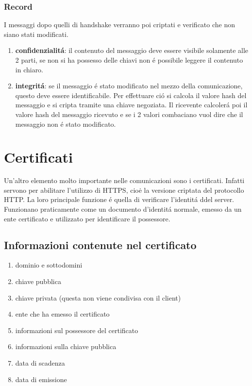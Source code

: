 \subsubsection{Record}
I messaggi dopo quelli di handshake verranno poi criptati e verificato che non siano stati modificati.
\begin{enumerate}
\item \textbf{confidenzialitá}: il contenuto del messaggio deve essere visibile solamente alle 2 parti, se non si ha possesso delle chiavi non é possibile leggere il contenuto in chiaro.
\item \textbf{integritá}: se il messaggio é stato modificato nel mezzo della comunicazione, questo deve essere identificabile. Per effettuare ció si calcola il valore hash del messaggio e si cripta tramite una chiave negoziata. Il ricevente calcolerá poi il valore hash del messaggio ricevuto e se i 2 valori combaciano vuol dire che il messaggio non é stato modificato.
\end{enumerate}

\section{Certificati}
\cite{certificates}
Un'altro elemento molto importante nelle comunicazioni sono i certificati. Infatti servono per abilitare l'utilizzo di HTTPS, cioė la versione criptata del protocollo HTTP. La loro principale funzione é quella di verificare l'identitá ddel server. Funzionano praticamente come un documento d'identitá normale, emesso da un ente certificato e utilizzato per identificare il possessore.
\subsection{Informazioni contenute nel certificato}
\begin{enumerate}
  \item dominio e sottodomini
  \item chiave pubblica
  \item chiave privata (questa non viene condivisa con il client)
  \item ente che ha emesso il certificato
  \item informazioni sul possessore del certificato
  \item informazioni sulla chiave pubblica
  \item data di scadenza
  \item data di emissione

\end{enumerate}
